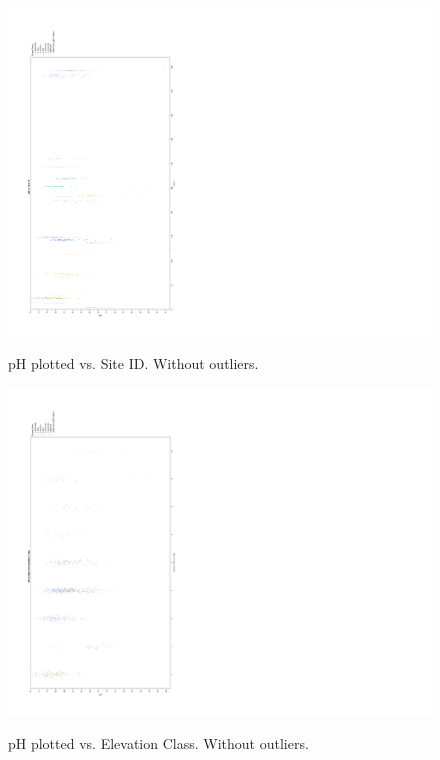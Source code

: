 \documentclass[11pt]{article} %
\begin{document}
\begin{figure}[h!]
  \caption{pH plotted vs. Site ID.  Without outliers.}
   \includegraphics[width=11 in,clip=true,trim=0 30 150 40]{CAgraph6}\\
\label{fig:figure6}
\end{figure}
\pagebreak

\begin{figure}[h!]
  \caption{pH plotted vs. Elevation Class.  Without outliers.}
  \includegraphics[width=11 in,clip=true,trim=0 30 150 40]{CAgraph8}\\
\label{fig:figure8}
\end{figure}
\pagebreak
\end{document}
